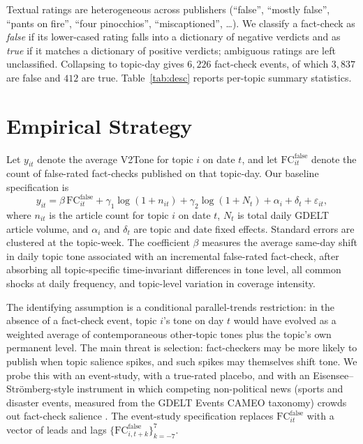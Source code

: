 \documentclass[12pt]{article}
\begin{document}
Textual ratings are heterogeneous across publishers (``false'', ``mostly false'', ``pants on fire'', ``four pinocchios'', ``miscaptioned'', \ldots). We classify a fact-check as \emph{false} if its lower-cased rating falls into a dictionary of negative verdicts and as \emph{true} if it matches a dictionary of positive verdicts; ambiguous ratings are left unclassified. Collapsing to topic-day gives $6{,}226$ fact-check events, of which $3{,}837$ are false and $412$ are true. Table~\ref{tab:desc} reports per-topic summary statistics.



\section{Empirical Strategy}

Let $y_{it}$ denote the average V2Tone for topic $i$ on date $t$, and let $\mathrm{FC}^{\text{false}}_{it}$ denote the count of false-rated fact-checks published on that topic-day. Our baseline specification is
\begin{equation}
y_{it} = \beta\,\mathrm{FC}^{\text{false}}_{it} + \gamma_1\log(1+n_{it}) + \gamma_2\log(1+N_t) + \alpha_i + \delta_t + \varepsilon_{it},
\label{eq:main}
\end{equation}
where $n_{it}$ is the article count for topic $i$ on date $t$, $N_t$ is total daily GDELT article volume, and $\alpha_i$ and $\delta_t$ are topic and date fixed effects. Standard errors are clustered at the topic-week. The coefficient $\beta$ measures the average same-day shift in daily topic tone associated with an incremental false-rated fact-check, after absorbing all topic-specific time-invariant differences in tone level, all common shocks at daily frequency, and topic-level variation in coverage intensity.

The identifying assumption is a conditional parallel-trends restriction: in the absence of a fact-check event, topic $i$'s tone on day $t$ would have evolved as a weighted average of contemporaneous other-topic tones plus the topic's own permanent level. The main threat is selection: fact-checkers may be more likely to publish when topic salience spikes, and such spikes may themselves shift tone. We probe this with an event-study, with a true-rated placebo, and with an Eisensee--Str\"omberg-style instrument in which competing non-political news (sports and disaster events, measured from the GDELT Events CAMEO taxonomy) crowds out fact-check salience \citep{eisensee2007}. The event-study specification replaces $\mathrm{FC}^{\text{false}}_{it}$ with a vector of leads and lags $\{\mathrm{FC}^{\text{false}}_{i,t+k}\}_{k=-7}^{7}$.
\end{document}
